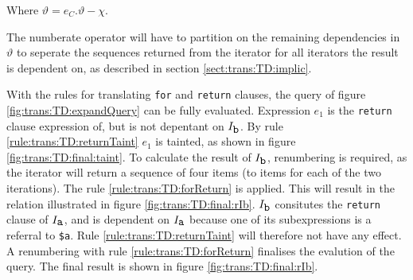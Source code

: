 Where $\vartheta = e_{C}.\vartheta - \chi$.

The \textsf{numberate} operator will have to partition on the remaining dependencies in $\vartheta$ to seperate
the sequences returned from the iterator for all iterators the result is dependent on, as described in section
\ref{sect:trans:TD:implic}.

\begin{myExample}

With the rules for translating \texttt{for} and \texttt{return} clauses, the query of figure
\ref{fig:trans:TD:expandQuery} can be fully evaluated. Expression $e_{1}$ is the \texttt{return} clause expression
of, but is not depentant on $I_{\mbox{\texttt{b}}}$. By rule \ref{rule:trans:TD:returnTaint} $e_{1}$ is tainted,
as shown in figure \ref{fig:trans:TD:final:taint}. To calculate the result of $I_{\mbox{\texttt{b}}}$,
renumbering is required, as the iterator will return a sequence of four items (to items for each of the two
iterations). The rule \ref{rule:trans:TD:forReturn} is applied. This will result in the relation illustrated in
figure \ref{fig:trans:TD:final:rIb}. $I_{\mbox{\texttt{b}}}$ consitutes the \texttt{return} clause of
$I_{\mbox{\texttt{a}}}$, and is dependent on $I_{\mbox{\texttt{a}}}$ because one of its subexpressions is a
referral to \texttt{\$a}. Rule \ref{rule:trans:TD:returnTaint} will therefore not have any effect. A renumbering
with rule \ref{rule:trans:TD:forReturn} finalises the evalution of the query. The final result is shown in figure
\ref{fig:trans:TD:final:rIb}.



\end{myExample}
